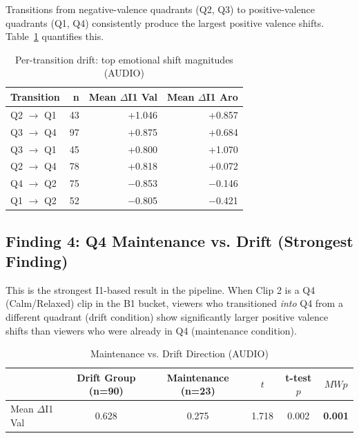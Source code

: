 \documentclass[11pt, a4paper]{report}
\begin{document}
Transitions from negative-valence quadrants (Q2, Q3) to positive-valence quadrants (Q1, Q4) consistently produce the largest positive valence shifts. Table~\ref{tab:transitions} quantifies this.

\begin{table}[H]
    \centering
    \small
    \caption{Per-transition drift: top emotional shift magnitudes (AUDIO)}
    \label{tab:transitions}
    \begin{tabular}{@{}lrrr@{}}
        \toprule
        \textbf{Transition} & \textbf{n} & \textbf{Mean $\Delta$I1 Val} & \textbf{Mean $\Delta$I1 Aro} \\
        \midrule
        Q2 $\rightarrow$ Q1 & 43 & +1.046 & +0.857 \\
        Q3 $\rightarrow$ Q4 & 97 & +0.875 & +0.684 \\
        Q3 $\rightarrow$ Q1 & 45 & +0.800 & +1.070 \\
        Q2 $\rightarrow$ Q4 & 78 & +0.818 & +0.072 \\
        Q4 $\rightarrow$ Q2 & 75 & $-$0.853 & $-$0.146 \\
        Q1 $\rightarrow$ Q2 & 52 & $-$0.805 & $-$0.421 \\
        \bottomrule
    \end{tabular}
\end{table}

\subsection{Finding 4: Q4 Maintenance vs. Drift (Strongest Finding)}

This is the strongest I1-based result in the pipeline. When Clip 2 is a Q4 (Calm/Relaxed) clip in the B1 bucket, viewers who transitioned \textit{into} Q4 from a different quadrant (drift condition) show significantly larger positive valence shifts than viewers who were already in Q4 (maintenance condition).

\begin{table}[H]
    \centering
    \small
    \caption{Maintenance vs. Drift Direction (AUDIO)}
    \label{tab:maint-drift}
    \begin{tabular}{@{}lccccc@{}}
        \toprule
        & \textbf{Drift Group (n=90)} & \textbf{Maintenance (n=23)} & \textbf{$t$} & \textbf{t-test $p$} & \textbf{$MW p$} \\
        \midrule
        Mean $\Delta$I1 Val & 0.628 & 0.275 & 1.718 & 0.002 & \textbf{0.001} \\
        \bottomrule
    \end{tabular}
\end{table}
\end{document}

